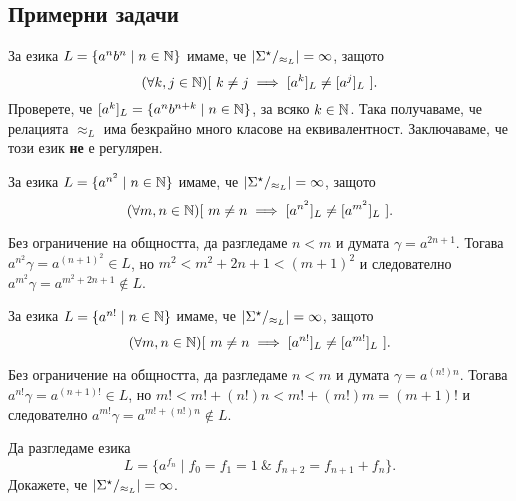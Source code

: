\subsection{Примерни задачи}

\begin{example}
  За езика $L = \{a^nb^n\mid n \in \mathbb{N}\}$ имаме, че $\vert{\Sigma^\star/_{\approx_L}}\vert = \infty$,
  защото \[(\forall k,j\in\mathbb{N})[\ k \neq j \implies [a^k]_L \neq [a^j]_L\ ].\]
  Проверете, че $[a^k]_L = \{a^nb^{n+k} \mid n \in \mathbb{N} \}$, за всяко $k \in \mathbb{N}$.
  Така получаваме, че релацията $\approx_L$ има безкрайно много класове на еквивалентност.
  Заключаваме, че този език {\bf не} е регулярен.
\end{example}

\begin{example}
  За езика $L = \{a^{n^2} \mid n \in \mathbb{N}\}$ имаме, че $\vert{\Sigma^\star/_{\approx_L}}\vert = \infty$,
  защото \[(\forall m,n\in\mathbb{N})[\ m \neq n \implies [a^{n^2}]_L \neq [a^{m^2}]_L\ ].\]
  
  Без ограничение на общността, да разгледаме $n < m$ и думата $\gamma = a^{2n+1}$.
  Тогава $a^{n^2}\gamma = a^{(n+1)^2} \in L$, но 
  $m^2 < m^2 + 2n + 1 < (m+1)^2$ и следователно $a^{m^2}\gamma = a^{m^2+2n+1}\not\in L$.
\end{example}

\begin{example}
  За езика $L = \{a^{n!} \mid n \in \mathbb{N}\}$ имаме, че $\vert{\Sigma^\star/_{\approx_L}}\vert = \infty$,
  защото \[(\forall m,n\in\mathbb{N})[\ m \neq n \implies [a^{n!}]_L \neq [a^{m!}]_L\ ].\]
  
  Без ограничение на общността, да разгледаме $n < m$ и думата $\gamma = a^{(n!)n}$.
  Тогава $a^{n!}\gamma = a^{(n+1)!} \in L$, но 
  $m! < m! + (n!)n < m! + (m!)m = (m+1)!$ и следователно $a^{m!}\gamma = a^{m!+(n!)n}\not\in L$.
\end{example}

\begin{problem}
  Да разгледаме езика
  \[L = \{a^{f_n} \mid f_0 = f_1 = 1\ \&\ f_{n+2} = f_{n+1} + f_{n}\}.\]
  Докажете, че $\vert{\Sigma^\star/_{\approx_L}}\vert = \infty$.
\end{problem}

